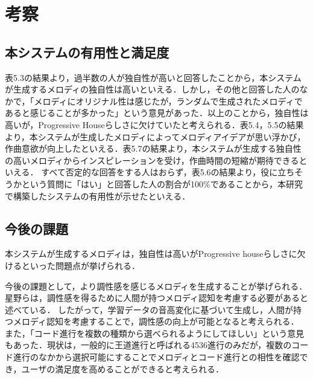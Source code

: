 \chapter{考察}
\section{本システムの有用性と満足度}
表5.3の結果より，過半数の人が独自性が高いと回答したことから，本システムが生成するメロディの独自性は高いといえる．しかし，その他と回答した人のなかで，「メロディにオリジナル性は感じたが，ランダムで生成されたメロディであると感じることが多かった」という意見があった．以上のことから，独自性は高いが，Progressive Houseらしさに欠けていたと考えられる．表5.4，5.5の結果より，本システムが生成したメロディによってメロディアイデアが思い浮かび，作曲意欲が向上したといえる．表5.7の結果より，本システムが生成する独自性の高いメロディからインスピレーションを受け，作曲時間の短縮が期待できるといえる．
すべて否定的な回答をする人はおらず，表5.6の結果より，役に立ちそうかという質問に「はい」と回答した人の割合が100\%であることから，本研究で構築したシステムの有用性が示せたといえる．
\section{今後の課題}
本システムが生成するメロディは，独自性は高いがProgressive houseらしさに欠けるといった問題点が挙げられる．

今後の課題として，より調性感を感じるメロディを生成することが挙げられる．
星野らは，調性感を得るために人間が持つメロディ認知を考慮する必要があると述べている\cite{Hoshino84}．
したがって，学習データの音高変化に基づいて生成し，人間が持つメロディ認知を考慮することで，調性感の向上が可能となると考えられる．
また，「コード進行を複数の種類から選べられるようにしてほしい」という意見もあった．現状は，一般的に王道進行と呼ばれる4536進行のみだが，複数のコード進行のなかから選択可能にすることでメロディとコード進行との相性を確認でき，ユーザの満足度を高めることができると考えられる．

